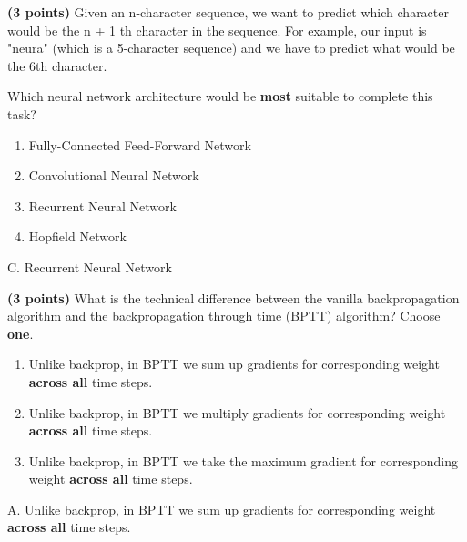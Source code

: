 \documentclass{article}
\begin{document}
\begin{probset}
\begin{prob}
    \begin{subprobset}
    \begin{subprob}
        \textbf{(3 points)} Given an n-character sequence, we want to predict which character would be the n + 1 th character in the sequence. For example, our input is "neura" (which is a 5-character sequence) and we have to predict what would be the 6th character. 
        
        Which neural network architecture would be \textbf{most} suitable to complete this task?
        \begin{enumerate}[label=\Alph*.]
            \item Fully-Connected Feed-Forward Network
            \item Convolutional Neural Network
            \item Recurrent Neural Network
            \item Hopfield Network
        \end{enumerate}

        \begin{soln}
            C. Recurrent Neural Network
        \end{soln}
    \end{subprob}

    \begin{subprob}
        \textbf{(3 points)} What is the technical difference between the vanilla backpropagation algorithm and the backpropagation through time (BPTT) algorithm? Choose \textbf{one}.
        \begin{enumerate}[label=\Alph*.]
            \item Unlike backprop, in BPTT we sum up gradients for corresponding weight \textbf{across all} time steps.
            \item Unlike backprop, in BPTT we multiply gradients for corresponding weight \textbf{across all} time steps.
            \item Unlike backprop, in BPTT we take the maximum gradient for corresponding weight \textbf{across all} time steps.
        \end{enumerate}

        \begin{soln}
            A. Unlike backprop, in BPTT we sum up gradients for corresponding weight \textbf{across all} time steps.
        \end{soln}
    \end{subprob}


\end{subprobset}
\end{prob}
\end{probset}
\end{document}
